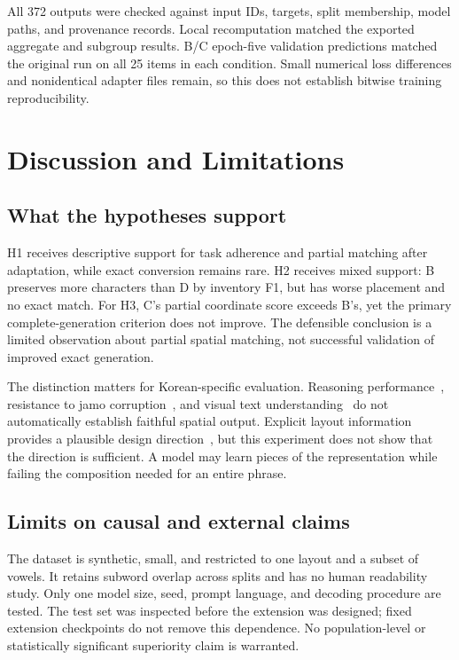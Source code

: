 \documentclass[journal]{IEEEtran}
\begin{document}
All 372 outputs were checked against input IDs, targets, split membership, model paths, and provenance records. Local recomputation matched the exported aggregate and subgroup results. B/C epoch-five validation predictions matched the original run on all 25 items in each condition. Small numerical loss differences and nonidentical adapter files remain, so this does not establish bitwise training reproducibility.

\section{Discussion and Limitations}
\subsection{What the hypotheses support}
H1 receives descriptive support for task adherence and partial matching after adaptation, while exact conversion remains rare. H2 receives mixed support: B preserves more characters than D by inventory F1, but has worse placement and no exact match. For H3, C's partial coordinate score exceeds B's, yet the primary complete-generation criterion does not improve. The defensible conclusion is a limited observation about partial spatial matching, not successful validation of improved exact generation.

The distinction matters for Korean-specific evaluation. Reasoning performance~\cite{naver2025think}, resistance to jamo corruption~\cite{lee2026jamo}, and visual text understanding~\cite{hwang2025kreta} do not automatically establish faithful spatial output. Explicit layout information provides a plausible design direction~\cite{lu2025bounding}, but this experiment does not show that the direction is sufficient. A model may learn pieces of the representation while failing the composition needed for an entire phrase.

\subsection{Limits on causal and external claims}
The dataset is synthetic, small, and restricted to one layout and a subset of vowels. It retains subword overlap across splits and has no human readability study. Only one model size, seed, prompt language, and decoding procedure are tested. The test set was inspected before the extension was designed; fixed extension checkpoints do not remove this dependence. No population-level or statistically significant superiority claim is warranted.
\end{document}

